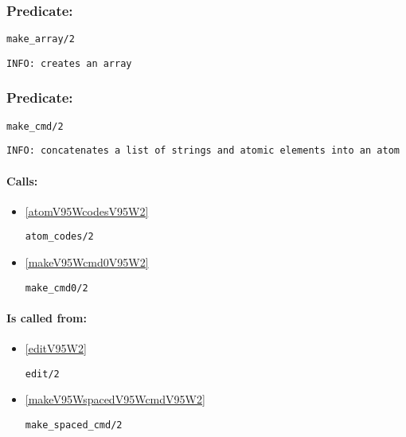 \subsubsection{Predicate:} \label{makeV95WarrayV95W2}

\begin{verbatim}
make_array/2
\end{verbatim}

{\small \begin{verbatim}
INFO: creates an array

\end{verbatim}}

\subsubsection{Predicate:} \label{makeV95WcmdV95W2}

\begin{verbatim}
make_cmd/2
\end{verbatim}

{\small \begin{verbatim}
INFO: concatenates a list of strings and atomic elements into an atom

\end{verbatim}}
\paragraph{Calls:} 
\begin{itemize}
\item \ref{atomV95WcodesV95W2} 
\begin{verbatim}
atom_codes/2
\end{verbatim}

\item \ref{makeV95Wcmd0V95W2} 
\begin{verbatim}
make_cmd0/2
\end{verbatim}

\end{itemize}
\paragraph{Is called from:} 
\begin{itemize}
\item \ref{editV95W2} 
\begin{verbatim}
edit/2
\end{verbatim}

\item \ref{makeV95WspacedV95WcmdV95W2} 
\begin{verbatim}
make_spaced_cmd/2
\end{verbatim}

\end{itemize}


